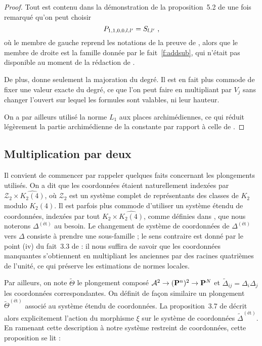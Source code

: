 \begin{proof} \later
  Tout est contenu dans la démonstration de la proposition~5.2 de \cite[pp.
  126-128]{remivds} une fois remarqué qu'on peut choisir
  \begin{equation}
    P_{1, 1, 0, 0, l, l'} = S_{l, l'}
    \text{ ,}
  \end{equation}
  où le membre de gauche reprend les notations de la preuve de ,
  alors que le membre de droite est la famille donnée par le
  fait~\ref{f:addsub}, qui n'était pas disponible au moment de la
  rédaction de \cite{remivds}.

  De plus,  donne seulement la majoration du degré. Il est en
  fait plus commode de fixer une valeur exacte du degré, ce que l'on peut
  faire en multipliant par $V_j$ sans changer l'ouvert sur lequel les
  formules sont valables, ni leur hauteur.

  On a par ailleurs utilisé la norme $L_1$ aux places archimédiennes, ce qui
  réduit légèrement la partie archimédienne de la constante par rapport à
  celle de .
\end{proof}


\subsection{Multiplication par deux}
\label{sec:form-ab2}


Il convient de commencer par rappeler quelques faits concernant les
plongements utilisés. On a dit que les coordonnées étaient naturellement
indexées par $\mathcal{Z}_2 \times \widehat{K_2(4)}$, où $\mathcal{Z}_2$ est
un système complet de représentants des classes de $K_2$ modulo $K_2(4)$. Il
est parfois plus commode d'utiliser un système étendu de coordonnées, indexées
par tout $K_2 \times \widehat{K_2(4)}$, comme définies dans
\cite[p.~651]{daphimhva2}, que nous noterons $\Delta^{(\text{ét})}$ au
besoin. Le changement de système de coordonnées de $\Delta^{(\text{ét})}$ vers
$\Delta$ consiste à prendre une sous-famille ; le sens contraire est donné par
le point (iv) du fait~3.3 de  : il nous suffira de savoir que
les coordonnées manquantes s'obtiennent en multipliant les anciennes par des
racines quatrièmes de l'unité, ce qui préserve les estimations de normes
locales.

Par ailleurs, on note $\tilde\Theta$ le plongement composé $\mathcal A^2 \to
({\mathbf{P}}^n)^2 \to {\mathbf{P}}^N$ et $\tilde\Delta_{ij} = \Delta_i\Delta_j$ les
coordonnées correspondantes. On définit de façon similaire un plongement
$\tilde\Theta^{(\text{ét})}$ associé au système étendu de coordonnées. La
proposition~3.7 de \cite{daphimhva2} décrit alors explicitement l'action du
morphisme $\xi$ sur le système de coordonnées $\tilde\Delta^{(\text{ét})}$. En
ramenant cette description à notre système restreint de coordonnées, cette
proposition se lit :

